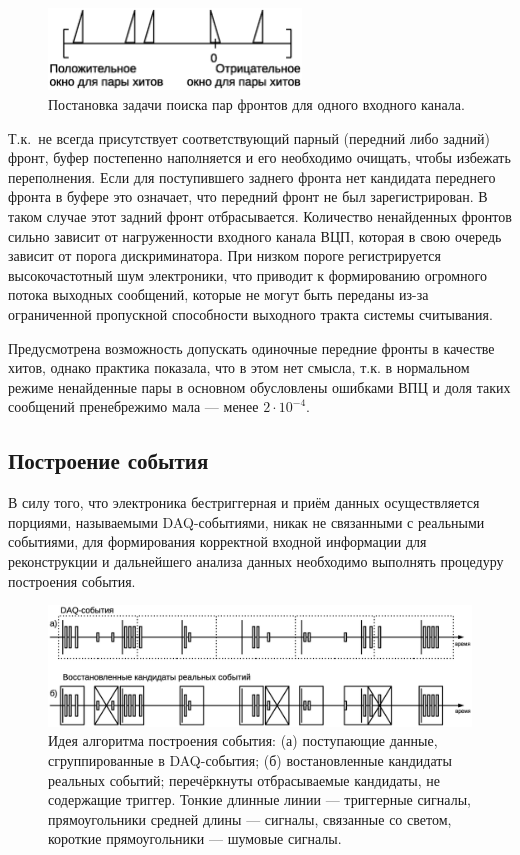 \begin{figure}[H]
\includegraphics[width=0.6\textwidth]{pictures/14_Edge_matching_rus.eps}
\caption{Постановка задачи поиска пар фронтов для одного входного канала.}
\label{fig:EdgeMatching}
\end{figure}

Т.к.~не всегда присутствует соответствующий парный (передний либо задний) фронт, буфер постепенно наполняется и его необходимо очищать, чтобы избежать переполнения. Если для поступившего заднего фронта нет кандидата переднего фронта в буфере это означает, что передний фронт не был зарегистрирован. В таком случае этот задний фронт отбрасывается. Количество ненайденных фронтов сильно зависит от нагруженности входного канала ВЦП, которая в свою очередь зависит от порога дискриминатора. При низком пороге регистрируется высокочастотный шум электроники, что приводит к формированию огромного потока выходных сообщений, которые не могут быть переданы из-за ограниченной пропускной способности выходного тракта системы считывания.

Предусмотрена возможность допускать одиночные передние фронты в качестве хитов, однако практика показала, что в этом нет смысла, т.к. в нормальном режиме ненайденные пары в основном обусловлены ошибками ВПЦ и доля таких сообщений пренебрежимо мала --- менее $ 2 \cdot 10^{-4} $.

\subsection{Построение события}

В силу того, что электроника бестриггерная и приём данных осуществляется порциями, называемыми DAQ-событиями, никак не связанными с реальными событиями, для формирования корректной входной информации для реконструкции и дальнейшего анализа данных необходимо выполнять процедуру построения события.

\begin{figure}[H]
\includegraphics[width=1.0\textwidth]{pictures/15_Event_building_rus_bw.eps}
\caption{Идея алгоритма построения события: (а) поступающие данные, сгруппированные в DAQ-события; (б) востановленные кандидаты реальных событий; перечёркнуты отбрасываемые кандидаты, не содержащие триггер. Тонкие длинные линии --- триггерные сигналы, прямоугольники средней длины --- сигналы, связанные со светом, короткие прямоугольники --- шумовые сигналы.}
\label{fig:EventBuilding}
\end{figure}

